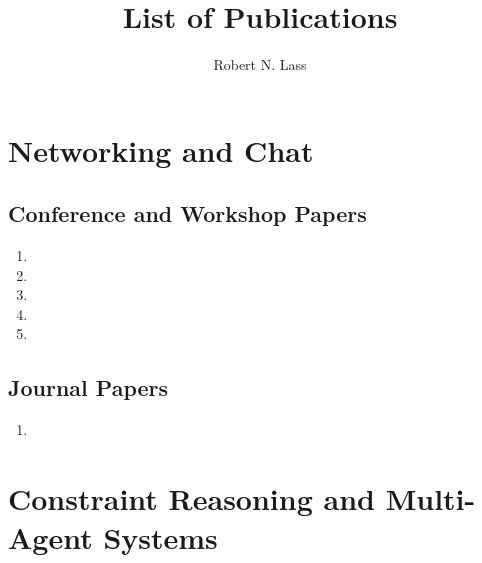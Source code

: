 \documentclass{article}
\begin{document}
	
    \title{List of Publications}
    \author{Robert N. Lass}
    \date{}
    \maketitle

	\section*{Networking and Chat}
		\subsection*{Conference and Workshop Papers}
            \begin{enumerate}[series=pubs]
				\item {}
				\item {}
				\item {}
				\item {}
				\item {}
			\end{enumerate}

		\subsection*{Journal Papers}
			\begin{enumerate}[resume=pubs]
				\item {}
			\end{enumerate}

	\section*{Constraint Reasoning and Multi-Agent Systems}
\end{document}
